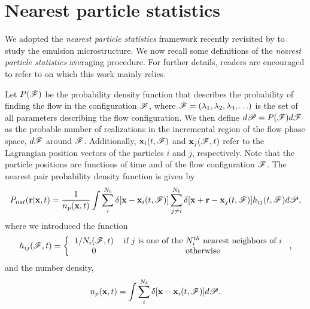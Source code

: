 \section{Nearest particle statistics}
\label{sec:nearest}

We adopted the \textit{nearest particle statistics} framework recently revisited by \citet{zhang2021ensemble} to study the emulsion microstructure.
We now recall some definitions of the \textit{nearest particle statistics} averaging procedure. 
For further details, readers are encouraged to refer to \citet{zhang2021ensemble,zhang2023evolution} on which this work mainly relies.

Let $P(\mathscr{F})$ be the probability density function that describes the probability of finding the flow in the configuration $\mathscr{F}$, where $\mathscr{F} = (\lambda_1,\lambda_2,\lambda_3,\ldots)$ is the set of all parameters describing the flow configuration.
We then define $d\mathscr{P} = P(\mathscr{F})d\mathscr{F}$ as the probable number of realizations in the incremental region of the flow phase space, $d\mathscr{F}$ around $\mathscr{F}$.
Additionally,  $\textbf{x}_i(t,\mathscr{F})$ and $\textbf{x}_j(\mathscr{F},t)$ refer to the Lagrangian position vectors of the particles $i$ and $j$, respectively. 
Note that the particle positions are functions of time and of the flow configuration $\mathscr{F}$. 
The nearest pair probability density function is given by \citep{zhang2021ensemble,zhang2023evolution}
\begin{equation}
    P_{nst}(\textbf{r}|\textbf{x},t)= \frac{1}{n_p(\textbf{x},t)}
    \int \sum_{i}^{N_b}\delta[\textbf{x}-\textbf{x}_i(t,\FF)]
    \sum_{j\neq i}^{N_b}\delta[\textbf{x}+\textbf{r}-\textbf{x}_j(t,\FF)]
    h_{ij} (t,\FF)
    d\mathscr{P},
    \label{eq:P_nstij}
\end{equation}
where we introduced the function 
\begin{equation*}
    h_{ij}(\FF,t)
    = \left\{
        \begin{tabular}{cc}
            $1/N_i(\FF,t)$ & if $j$ is one of the $N^{th}_i$ nearest neighbors of $i$ \\
            0& otherwise
        \end{tabular}
        \right. ,
\end{equation*}
and the number density, 
\begin{equation}
    n_p(\textbf{x},t)= 
    \int \sum_{i}^{N_b}\delta[\textbf{x}-\textbf{x}_i(t,\FF)] d\mathscr{P}.
    \label{eq:n_p}
\end{equation}
